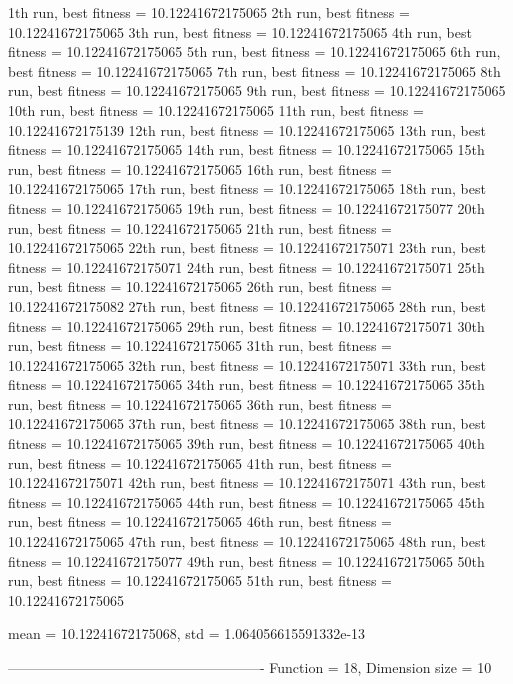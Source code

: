 1th run, best fitness = 10.12241672175065
2th run, best fitness = 10.12241672175065
3th run, best fitness = 10.12241672175065
4th run, best fitness = 10.12241672175065
5th run, best fitness = 10.12241672175065
6th run, best fitness = 10.12241672175065
7th run, best fitness = 10.12241672175065
8th run, best fitness = 10.12241672175065
9th run, best fitness = 10.12241672175065
10th run, best fitness = 10.12241672175065
11th run, best fitness = 10.12241672175139
12th run, best fitness = 10.12241672175065
13th run, best fitness = 10.12241672175065
14th run, best fitness = 10.12241672175065
15th run, best fitness = 10.12241672175065
16th run, best fitness = 10.12241672175065
17th run, best fitness = 10.12241672175065
18th run, best fitness = 10.12241672175065
19th run, best fitness = 10.12241672175077
20th run, best fitness = 10.12241672175065
21th run, best fitness = 10.12241672175065
22th run, best fitness = 10.12241672175071
23th run, best fitness = 10.12241672175071
24th run, best fitness = 10.12241672175071
25th run, best fitness = 10.12241672175065
26th run, best fitness = 10.12241672175082
27th run, best fitness = 10.12241672175065
28th run, best fitness = 10.12241672175065
29th run, best fitness = 10.12241672175071
30th run, best fitness = 10.12241672175065
31th run, best fitness = 10.12241672175065
32th run, best fitness = 10.12241672175071
33th run, best fitness = 10.12241672175065
34th run, best fitness = 10.12241672175065
35th run, best fitness = 10.12241672175065
36th run, best fitness = 10.12241672175065
37th run, best fitness = 10.12241672175065
38th run, best fitness = 10.12241672175065
39th run, best fitness = 10.12241672175065
40th run, best fitness = 10.12241672175065
41th run, best fitness = 10.12241672175071
42th run, best fitness = 10.12241672175071
43th run, best fitness = 10.12241672175065
44th run, best fitness = 10.12241672175065
45th run, best fitness = 10.12241672175065
46th run, best fitness = 10.12241672175065
47th run, best fitness = 10.12241672175065
48th run, best fitness = 10.12241672175077
49th run, best fitness = 10.12241672175065
50th run, best fitness = 10.12241672175065
51th run, best fitness = 10.12241672175065

mean = 10.12241672175068, std = 1.064056615591332e-13

-------------------------------------------------------
Function = 18, Dimension size = 10

